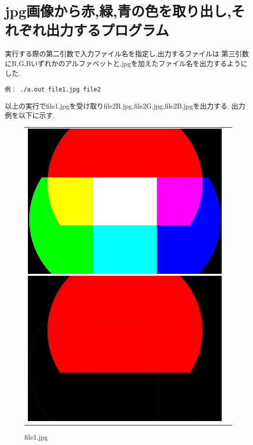 \documentclass[a4j]{jarticle}
\begin{document}
\section{jpg画像から赤,緑,青の色を取り出し,それぞれ出力するプログラム}
実行する際の第二引数で入力ファイル名を指定し,出力するファイルは
第三引数にR,G,Bいずれかのアルファベットと.jpgを加えたファイル名を出力するようにした.
\begin{verbatim}
例： ./a.out file1.jpg file2
\end{verbatim}
以上の実行でfile1.jpgを受け取りfile2R.jpg,file2G.jpg,file2B.jpgを出力する.
出力例を以下に示す.\\
\begin{figure}
\begin{tabular}{cc}
\begin{minipage}{0.5\hsize}
\includegraphics[bb=0 0 768 576,scale=.3]{sangen.jpg}
\caption{file1.jpg}
\end{minipage}
\begin{minipage}{0.5\hsize}
\includegraphics[bb=0 0 768 576,scale=.3]{fileR.jpg}

\end{minipage}
\end{tabular}
\end{figure}
\end{document}
